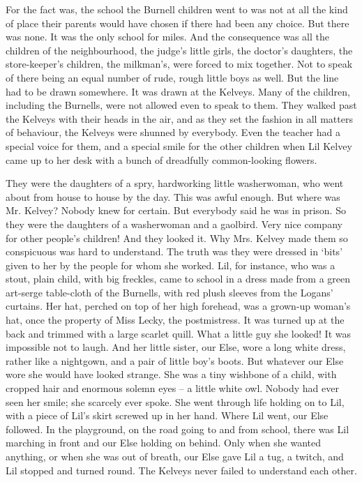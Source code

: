 \documentclass[10pt,a4paper]{article}
\begin{document}
For the fact was, the school the Burnell children went to was not at all the kind of place their parents would have chosen if there had been any choice. But there was none. It was the only school for miles. And the consequence was all the children of the neighbourhood, the judge’s little girls, the doctor’s daughters, the store-keeper’s children, the milkman’s, were forced to mix together. Not to speak of there being an equal number of rude, rough little boys as well. But the line had to be drawn somewhere. It was drawn at the Kelveys. Many of the children, including the Burnells, were not allowed even to speak to them. They walked past the Kelveys with their heads in the air, and as they set the fashion in all matters of behaviour, the Kelveys were shunned by everybody. Even the teacher had a special voice for them, and a special smile for the other children when Lil Kelvey came up to her desk with a bunch of dreadfully common-looking flowers.

They were the daughters of a spry, hardworking little washerwoman, who went about from house to house by the day. This was awful enough. But where was Mr. Kelvey? Nobody knew for certain. But everybody said he was in prison. So they were the daughters of a washerwoman and a gaolbird. Very nice company for other people’s children! And they looked it. Why Mrs. Kelvey made them so conspicuous was hard to understand. The truth was they were dressed in ‘bits’ given to her by the people for whom she worked. Lil, for instance, who was a stout, plain child, with big freckles, came to school in a dress made from a green art-serge table-cloth of the Burnells, with red plush sleeves from the Logans’ curtains. Her hat, perched on top of her high forehead, was a grown-up woman’s hat, once the property of Miss Lecky, the postmistress. It was turned up at the back and trimmed with a large scarlet quill. What a little guy she looked! It was impossible not to laugh. And her little sister, our Else, wore a long white dress, rather like a nightgown, and a pair of little boy’s boots. But whatever our Else wore she would have looked strange. She was a tiny wishbone of a child, with cropped hair and enormous solemn eyes – a little white owl. Nobody had ever seen her smile; she scarcely ever spoke. She went through life holding on to Lil, with a piece of Lil’s skirt screwed up in her hand. Where Lil went, our Else followed. In the playground, on the road going to and from school, there was Lil marching in front and our Else holding on behind. Only when she wanted anything, or when she was out of breath, our Else gave Lil a tug, a twitch, and Lil stopped and turned round. The Kelveys never failed to understand each other.
\end{document}
